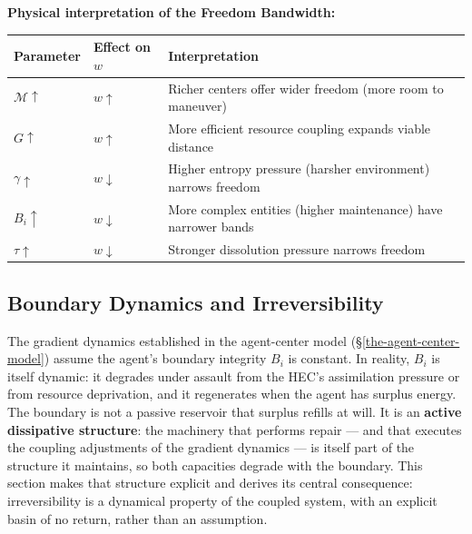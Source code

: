 \documentclass[11pt]{article}
\theoremstyle{plain}
\theoremstyle{definition}
\theoremstyle{remark}
\newcounter{none}
\let\origsubsection\subsection
\renewcommand{\subsection}{\needspace{7\baselineskip}\origsubsection}
\begin{document}
\textbf{Physical interpretation of the Freedom Bandwidth:}

{\def\LTcaptype{none} %
\begin{longtable}[]{@{}
  >{\raggedright\arraybackslash}p{}
  >{\raggedright\arraybackslash}p{}
  >{\raggedright\arraybackslash}p{}@{}}
\toprule\noalign{}
\begin{minipage}[b]{\linewidth}\raggedright
Parameter
\end{minipage} & \begin{minipage}[b]{\linewidth}\raggedright
Effect on \(w\)
\end{minipage} & \begin{minipage}[b]{\linewidth}\raggedright
Interpretation
\end{minipage} \\
\midrule\noalign{}
\endhead
\bottomrule\noalign{}
\endlastfoot
\(\mathcal{M} \uparrow\) & \(w \uparrow\) & Richer centers offer wider
freedom (more room to maneuver) \\
\(G \uparrow\) & \(w \uparrow\) & More efficient resource coupling
expands viable distance \\
\(\gamma \uparrow\) & \(w \downarrow\) & Higher entropy pressure
(harsher environment) narrows freedom \\
\(B_i \uparrow\) & \(w \downarrow\) & More complex entities (higher
maintenance) have narrower bands \\
\(\tau \uparrow\) & \(w \downarrow\) & Stronger dissolution pressure
narrows freedom \\
\end{longtable}
}

\subsection{Boundary Dynamics and
Irreversibility}\label{boundary-dynamics-and-irreversibility}

The gradient dynamics established in the agent-center model
(§\ref{the-agent-center-model}) assume the agent's boundary integrity
\(B_i\) is constant. In reality, \(B_i\) is itself dynamic: it degrades
under assault from the HEC's assimilation pressure or from resource
deprivation, and it regenerates when the agent has surplus energy. The
boundary is not a passive reservoir that surplus refills at will. It is
an \textbf{active dissipative structure}: the machinery that performs
repair --- and that executes the coupling adjustments of the gradient
dynamics --- is itself part of the structure it maintains, so both
capacities degrade with the boundary. This section makes that structure
explicit and derives its central consequence: irreversibility is a
dynamical property of the coupled system, with an explicit basin of no
return, rather than an assumption.
\end{document}
